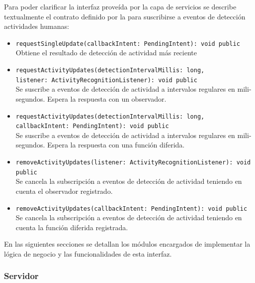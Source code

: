 Para poder clarificar la interfaz proveída por la capa de servicios
se describe textualmente el contrato definido por la  para
suscribirse a eventos de detección actividades humanas:
\begin{itemize}
\item \texttt{\footnotesize{}requestSingleUpdate(callbackIntent: PendingIntent): void
public} \\
Obtiene el resultado de detección de actividad más reciente 
\item \texttt{\footnotesize{}requestActivityUpdates(detectionIntervalMillis: long,
}~\\
\texttt{\footnotesize{}listener: ActivityRecognitionListener): void
public}\\
Se suscribe a eventos de detección de actividad a intervalos regulares
en mili-segundos. Espera la respuesta con un observador.
\item \texttt{\footnotesize{}requestActivityUpdates(detectionIntervalMillis: long,
}~\\
\texttt{\footnotesize{}callbackIntent: PendingIntent): void public}
\\
Se suscribe a eventos de detección de actividad a intervalos regulares
en mili-segundos. Espera la respuesta con una función diferida.
\item \texttt{\footnotesize{}removeActivityUpdates(listener: ActivityRecognitionListener): void
public} \\
Se cancela la subscripción a eventos de detección de actividad teniendo
en cuenta el observador registrado.
\item \texttt{\footnotesize{}removeActivityUpdates(callbackIntent: PendingIntent): void
public}\\
Se cancela la subscripción a eventos de detección de actividad teniendo
en cuenta la función diferida registrada.
\end{itemize}
En las siguientes secciones se detallan los módulos encargados de
implementar la lógica de negocio y las funcionalidades de esta interfaz.

\subsubsection{Servidor}

